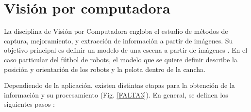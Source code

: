 
\section{Visión por computadora}

La disciplina de Visión por Computadora engloba el estudio de métodos de
captura, mejoramiento, y extracción de información a partir de imágenes. Su
objetivo principal es definir un modelo de una escena a partir de
imágenes \cite{cvLinda2001}. En el caso particular del fútbol de robots, el
modelo que se quiere definir describe la posición y orientación de los robots y
la pelota dentro de la cancha.

Dependiendo de la aplicación, existen distintas etapas para la obtención de la
información y su procesamiento (Fig. \ref{FALTA3}). En general, se definen los
siguientes pasos \cite{digitalImageProcessing2ed,wikiCV}:

